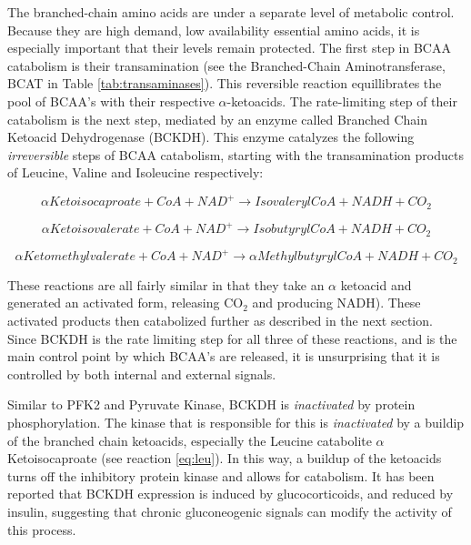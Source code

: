\documentclass{tufte-handout}
\begin{document}
The branched-chain amino acids are under a separate level of metabolic control.  Because they are high demand, low availability essential amino acids, it is especially important that their levels remain protected.  The first step in BCAA catabolism is their transamination (see the Branched-Chain Aminotransferase, BCAT in Table \ref{tab:transaminases}).  This reversible reaction equillibrates the pool of BCAA's with their respective $\alpha$-ketoacids.  The rate-limiting step of their catabolism is the next step, mediated by an enzyme called Branched Chain Ketoacid Dehydrogenase (BCKDH).  This enzyme catalyzes the following \emph{irreversible} steps of BCAA catabolism, starting with the transamination products of Leucine, Valine and Isoleucine respectively:

\begin{equation}\label{eq:leu}
\alpha Ketoisocaproate + CoA + NAD^+ \rightarrow IsovalerylCoA + NADH + CO_2
\end{equation}

\begin{equation}\label{eq:val}
\alpha Ketoisovalerate + CoA + NAD^+ \rightarrow IsobutyrylCoA + NADH + CO_2
\end{equation}

\begin{equation}\label{eq:iso}
\alpha Ketomethylvalerate + CoA + NAD^+ \rightarrow \alpha MethylbutyrylCoA + NADH + CO_2
\end{equation}

These reactions are all fairly similar in that they take an $\alpha$ ketoacid and generated an activated form, releasing CO$_2$ and producing NADH).  These activated products then catabolized further as described in the next section.  Since BCKDH is the rate limiting step for all three of these reactions, and is the main control point by which BCAA's are released, it is unsurprising that it is controlled by both internal and external signals.

  Similar to PFK2 and Pyruvate Kinase, BCKDH is \emph{inactivated} by protein phosphorylation.  The kinase that is responsible for this is \emph{inactivated} by a buildip of the branched chain ketoacids, especially the Leucine catabolite $\alpha$ Ketoisocaproate (see reaction \ref{eq:leu}).  In this way, a buildup of the ketoacids turns off the inhibitory protein kinase and allows for catabolism.  It has been reported that BCKDH expression is induced by glucocorticoids, and reduced by insulin, suggesting that chronic gluconeogenic signals can modify the activity of this process. 
\end{document}
